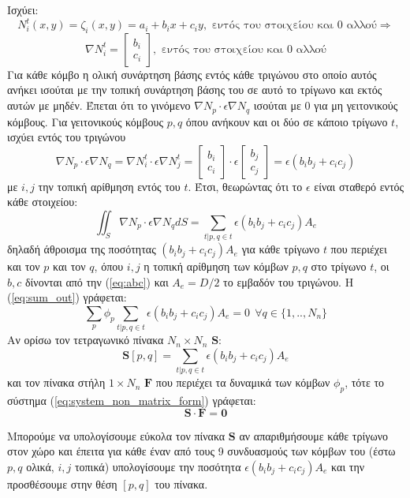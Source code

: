 \documentclass[10pt, letterpaper]{article}
\begin{document}
Ισχύει:
\[ N_i^t (x,y) =  \zeta_i(x,y) = a_i + b_ix + c_iy, \text{\ εντός του στοιχείου και $0$ αλλού}\Rightarrow\]
\[ \nabla N_i^t =   
    \begin{bmatrix}
        b_i \\
        c_i
    \end{bmatrix}
                    , \text{\ εντός του στοιχείου και $0$ αλλού}\]
Για κάθε κόμβο η ολική συνάρτηση βάσης εντός κάθε τριγώνου στο οποίο αυτός ανήκει ισούται με 
την τοπική συνάρτηση βάσης του σε αυτό το τρίγωνο και εκτός αυτών με μηδέν.
Έπεται ότι το γινόμενο $\nabla N_p \cdot \epsilon \nabla N_q$ ισούται με $0$ για μη γειτονικούς κόμβους. Για γειτονικούς κόμβους $p,q$ όπου 
ανήκουν και οι δύο σε κάποιο 
τρίγωνο $t$, ισχύει εντός του τριγώνου
\[ \nabla N_p  \cdot \epsilon \nabla N_q  = \nabla N_i^t \cdot \epsilon \nabla N_j^t = 
    \begin{bmatrix}
        b_i \\
        c_i
    \end{bmatrix}
      \cdot \epsilon
    \begin{bmatrix}
        b_j \\
        c_j        
    \end{bmatrix}
    =  \epsilon (b_ib_j + c_ic_j)
\]
με $i,j$ την τοπική αρίθμηση εντός του $t$. Έτσι, θεωρώντας ότι το $\epsilon$ είναι σταθερό εντός κάθε στοιχείου:
\begin{equation} \label{eq:int_of_grad_Np_Nq_}
  \iint_S \nabla N_p  \cdot \epsilon \nabla N_q  dS = \sum_{t | p,q \in t} \epsilon (b_ib_j + c_ic_j) A_e 
\end{equation}
δηλαδή άθροισμα της ποσότητας $(b_ib_j + c_ic_j) A_e $ για κάθε τρίγωνο $t$ που περιέχει και τον $p$ και τον $q$, 
όπου $i,j$ η τοπική αρίθμηση των κόμβων $p,q$ στο τρίγωνο $t$, οι $b,c$ δίνονται από την (\ref{eq:abc}) και $A_e = D/2$ το εμβαδόν του τριγώνου.
Η (\ref{eq:sum_out}) γράφεται:
\begin{equation}  \label{eq:system_non_matrix_form}
  \sum_p  \phi_p \sum_{t | p,q \in t} \epsilon (b_ib_j + c_ic_j) A_e  = 0   \ \ \forall q \in \{1,..,N_n\}
\end{equation}
Αν ορίσω τον τετραγωνικό πίνακα $N_n \times N_n$ $\mathbf{S}$:
\[ \mathbf{S}[p,q] =  \sum_{t | p,q \in t} \epsilon (b_ib_j + c_ic_j) A_e  \]
και τον πίνακα στήλη $1 \times N_n$ $\mathbf{F}$ που περιέχει τα δυναμικά των κόμβων $\phi_p$, τότε το σύστημα (\ref{eq:system_non_matrix_form}) γράφεται:
\[ \mathbf{S} \cdot \mathbf{F} = \mathbf{0} \]

Μπορούμε να υπολογίσουμε εύκολα τον πίνακα $\mathbf{S}$ αν απαριθμήσουμε κάθε τρίγωνο στον χώρο και έπειτα για κάθε έναν από τους
9 συνδυασμούς των κόμβων του (έστω $p,q$ ολικά, $i,j$ τοπικά) υπολογίσουμε την ποσότητα $\epsilon (b_ib_j + c_ic_j) A_e$ και την προσθέσουμε στην θέση $[p,q]$ του πίνακα.
\end{document}
